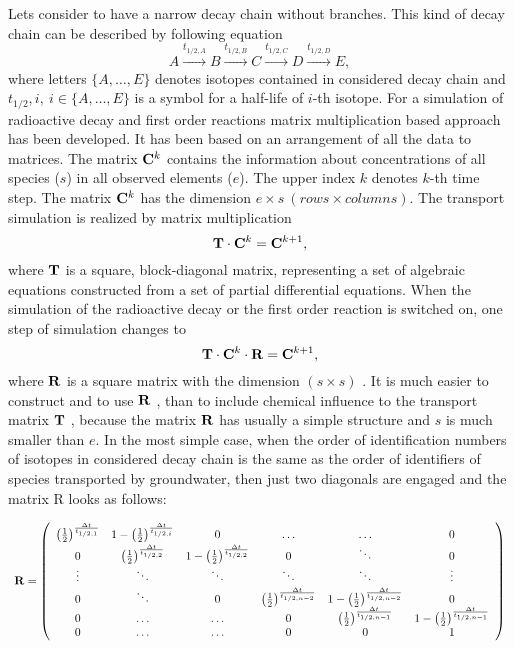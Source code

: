Lets consider to have a narrow decay chain without branches. This kind of decay chain can be described by following equation
\[
 A\xrightarrow{t_{1/2,A}}B\xrightarrow{t_{1/2,B}}C\xrightarrow{t_{1/2,C}}D\xrightarrow{t_{1/2,D}}E,
\]
where letters $\{A,\ldots, E\}$ denotes isotopes contained in considered decay chain and ${t_{1/2},i},~i\in\{A,\ldots, E\}$ is a symbol for a half-life of $i$-th isotope.
For a simulation of radioactive decay and first order reactions matrix multiplication based approach has been developed. It has been based on an arrangement of all the data to matrices. The matrix ${\bf C}^k$ contains the information about concentrations of all species ($s$) in all observed elements ($e$). The upper index $k$ denotes $k$-th time step. The matrix ${\bf C}^k$ has the dimension $e\times s~( rows \times columns)$.
The transport simulation is realized by matrix multiplication 
\[
  {\bf T}\cdot{\bf C}^k = {\bf C}^{k+1},
\]
where ${\bf T}$ is a square, block-diagonal matrix, representing a set of algebraic equations constructed from a set of partial differential equations.
When the simulation of the radioactive decay or the first order reaction is switched on, one step of
simulation changes to 
\[
  {\bf T}\cdot{\bf C}^k\cdot{\bf R} = {\bf C}^{k+1},
\]
where ${\bf R}$ is a square matrix with the dimension $(s \times s)$ . It is much easier to construct and to use ${\bf R}$ , than to include chemical influence to the transport
matrix ${\bf T}$ , because the matrix ${\bf R}$ has usually a simple structure and $s$ is much smaller than $e$. In the most simple case, when the order of identification numbers of isotopes in considered decay chain is the same as the order of identifiers of species transported by groundwater, then just two
diagonals are engaged and the matrix R looks as follows:

\begin{tiny}\[
   \begin{array}{l}
    {\bf R} = \left(
    \begin{array}{cccccc}
     \left(\frac{1}{2}\right)^\frac{\Delta t}{t_{1/2,1}} & 1 - \left(\frac{1}{2}\right)^\frac{\Delta t}{t_{1/2,i}} & 0 & \hdots & \hdots & 0\\
     0 & \left(\frac{1}{2}\right)^\frac{\Delta t}{t_{1/2,2}} & 1 - \left(\frac{1}{2}\right)^\frac{\Delta t}{t_{1/2,2}} & 0 & \ddots & 0 \\
     \vdots & \ddots & \ddots & \ddots & \ddots & \vdots\\
     0 & \ddots & 0 & \left(\frac{1}{2}\right)^\frac{\Delta t}{t_{1/2,n-2}} & 1 - \left(\frac{1}{2}\right)^\frac{\Delta t}{t_{1/2,n-2}} & 0 \\
     0 & \hdots & \hdots & 0 & \left(\frac{1}{2}\right)^\frac{\Delta t}{t_{1/2,n-1}} & 1 - \left(\frac{1}{2}\right)^\frac{\Delta t}{t_{1/2,n-1}}\\
     0 & \hdots & \hdots & 0 & 0 & 1
    \end{array}\right)
   \end{array}
\]\end{tiny}

